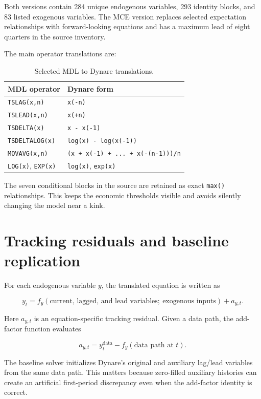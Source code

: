 \documentclass[11pt]{article}
\begin{document}
Both versions contain 284 unique endogenous variables, 293 identity blocks,
and 83 listed exogenous variables. The MCE version replaces selected
expectation relationships with forward-looking equations and has a maximum
lead of eight quarters in the source inventory.

The main operator translations are:

\begin{table}[H]
\centering
\caption{Selected MDL to Dynare translations.}
\begin{tabular}{ll}
\toprule
MDL operator & Dynare form \\
\midrule
\texttt{TSLAG(x,n)} & \texttt{x(-n)} \\
\texttt{TSLEAD(x,n)} & \texttt{x(+n)} \\
\texttt{TSDELTA(x)} & \texttt{x - x(-1)} \\
\texttt{TSDELTALOG(x)} & \texttt{log(x) - log(x(-1))} \\
\texttt{MOVAVG(x,n)} & \texttt{(x + x(-1) + ... + x(-(n-1)))/n} \\
\texttt{LOG(x)}, \texttt{EXP(x)} & \texttt{log(x)}, \texttt{exp(x)} \\
\bottomrule
\end{tabular}
\end{table}

The seven conditional blocks in the source are retained as exact \texttt{max()}
relationships. This keeps the economic thresholds visible and avoids silently
changing the model near a kink.

\section{Tracking residuals and baseline replication}

For each endogenous variable $y$, the translated equation is written as

\begin{equation}
y_t = f_y(\text{current, lagged, and lead variables};\ \text{exogenous inputs}) + a_{y,t}.
\end{equation}

Here $a_{y,t}$ is an equation-specific tracking residual. Given a data path,
the add-factor function evaluates

\begin{equation}
a_{y,t} = y_t^{\text{data}} - f_y(\text{data path at }t).
\end{equation}

The baseline solver initializes Dynare's original and auxiliary lag/lead
variables from the same data path. This matters because zero-filled
auxiliary histories can create an artificial first-period discrepancy even
when the add-factor identity is correct.
\end{document}
